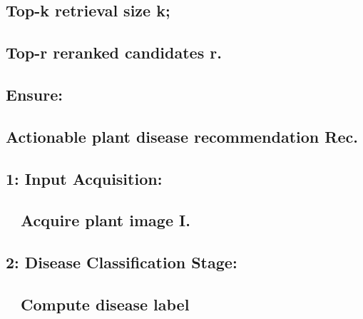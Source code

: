 \subsection*{Top-k retrieval size k;}\label{top-k-retrieval-size-k}

\subsection*{Top-r reranked candidates
r.}\label{top-r-reranked-candidates-r.}

\subsection*{Ensure:}\label{ensure}

\subsection*{Actionable plant disease recommendation
Rec.}\label{actionable-plant-disease-recommendation-rec.}

\subsection*{1: Input Acquisition:}\label{input-acquisition}

\subsection*{ Acquire plant image I.}\label{acquire-plant-image-i.}

\subsection*{2: Disease Classification
Stage:}\label{disease-classification-stage}

\subsection*{ Compute disease label}\label{compute-disease-label}

